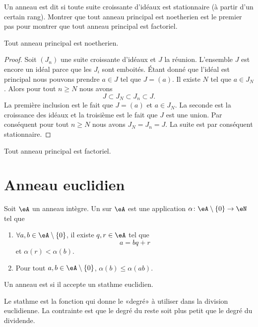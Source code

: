 Un anneau est dit  si toute suite croissante d'idéaux est stationnaire (à partir d'un certain rang). Montrer que tout anneau principal est noetherien est le premier pas pour montrer que tout anneau principal est factoriel.

\begin{lemma}
    Tout anneau principal est noetherien.
\end{lemma}

\begin{proof}
    Soit \( (J_n)\) une suite croissante d'idéaux et \( J\) la réunion. L'ensemble \( J\) est encore un idéal parce que les \( J_i\) sont emboités. Étant donné que l'idéal est principal nous pouvons prendre \( a\in J\) tel que \( J=(a)\). Il existe \( N\) tel que \( a\in J_N\). Alors pour tout \( n\geq N\) nous avons
    \begin{equation}
        J\subset J_N\subset J_n\subset J.
    \end{equation}
    La première inclusion est le fait que \( J=(a)\) et \( a\in J_N\). La seconde est la croissance des idéaux et la troisième est le fait que \( J\) est une union. Par conséquent pour tout \( n\geq N\) nous avons \( J_N=J_n=J\). La suite est par conséquent stationnaire.
\end{proof}

\begin{theorem}
    Tout anneau principal est factoriel.
\end{theorem}

\section{Anneau euclidien}

\begin{definition}
    Soit \( \eA\) un anneau intègre. Un  sur \( \eA\) est une application \( \alpha\colon \eA\setminus\{ 0 \}\to \eN\) tel que
    \begin{enumerate}
        \item
            \( \forall a,b\in \eA\setminus\{ 0 \}\), il existe \( q,r\in \eA\) tel que
            \begin{equation}
                a=bq+r
            \end{equation}
            et \( \alpha(r)<\alpha(b)\).
        \item
            Pour tout \( a,b\in \eA\setminus\{ 0 \}\), \( \alpha(b)\leq \alpha(ab)\).
    \end{enumerate}
    Un anneau est  si il accepte un stathme euclidien.
\end{definition}
Le stathme est la fonction qui donne le «degré» à utiliser dans la division euclidienne. La contrainte est que le degré du reste soit plus petit que le degré du dividende.

